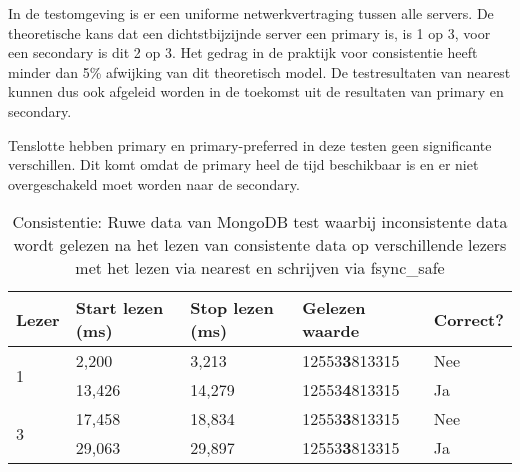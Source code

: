In de testomgeving is er een uniforme netwerkvertraging tussen alle servers. De theoretische kans dat een dichtstbijzijnde server een primary is, is 1 op 3, voor een secondary is dit 2 op 3. Het gedrag in de praktijk voor consistentie heeft minder dan 5\% afwijking van dit theoretisch model. De testresultaten van nearest kunnen dus ook afgeleid worden in de toekomst uit de resultaten van primary en secondary. 

Tenslotte hebben primary en primary-preferred in deze testen geen significante verschillen. Dit komt omdat de primary heel de tijd beschikbaar is en er niet overgeschakeld moet worden naar de secondary. 

\begin{table}
\centering
\begin{tabular}{l | l l l l}
Lezer & Start lezen (ms) & Stop lezen (ms) & Gelezen waarde & Correct? \\
\hline
\multirow{2}{*}{1} & 2,200 & 3,213 & 12553\textbf{3}813315 & Nee\\
 & 13,426 & 14,279 & 12553\textbf{4}813315 & Ja \\
 \multirow{2}{*}{3} & 17,458 & 18,834 & 12553\textbf{3}813315 & Nee\\
 & 29,063 & 29,897 & 12553\textbf{3}813315& Ja \\
\end{tabular}
\caption{Consistentie: Ruwe data van MongoDB test waarbij inconsistente data wordt gelezen na het lezen van consistente data op verschillende lezers met het lezen via nearest en schrijven via fsync\_safe}
\label{table:consistentie-mongodb-inconsistency}
\end{table}


